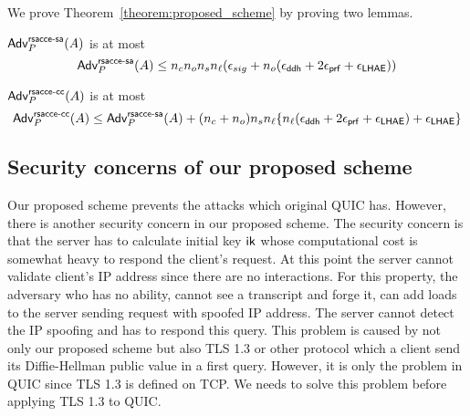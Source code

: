 We prove Theorem~\ref{theorem:proposed_scheme} by proving two lemmas.

\begin{lemma} \label{lemma:proposed_scheme_rsacce-sa}
 $\mathsf{Adv}^{\mathsf{rsacce\textsc{-} sa}}_{P}(A)$ is at most
 \begin{equation}
  \mathsf{Adv}^{\mathsf{rsacce\textsc{-} sa}}_{P}(A) \leq n_c n_o n_s n_{\ell}
  (\epsilon_{sig} + n_o (\epsilon_{\mathsf{ddh}} + 2\epsilon_{\mathsf{prf}} + \epsilon_{\mathsf{LHAE}}))
 \end{equation}
\end{lemma}
%


\begin{lemma} \label{lemma:proposed_scheme_rsacce-cc}
 $\mathsf{Adv}^{\mathsf{rsacce\textsc{-} cc}}_{P}(A)$ is at most
 \begin{equation}
  \mathsf{Adv}^{\mathsf{rsacce\textsc{-} cc}}_{P}(A) \leq \mathsf{Adv}^{\mathsf{rsacce\textsc{-} sa}}_{P}(A) +
  (n_c + n_o) n_s n_{\ell} \{ n_{\ell}(\epsilon_{\mathsf{ddh}} + 2\epsilon_{\mathsf{prf}} + \epsilon_{\mathsf{LHAE}})
  + \epsilon_{\mathsf{LHAE}} \}
 \end{equation}
\end{lemma}
%


\subsection{Security concerns of our proposed scheme} \label{sec:prop_sec_concerns}

Our proposed scheme prevents the attacks which original QUIC has.
However, there is another security concern in our proposed scheme.
The security concern is that the server has to calculate initial
key $\mathsf{ik}$ whose computational cost is somewhat heavy to respond the
client's request.
At this point the server cannot validate client's IP address since
there are no interactions.
For this property, the adversary who has no ability, cannot see a
transcript and forge it, can add loads to the server sending request
with spoofed IP address.
The server cannot detect the IP spoofing and has to respond this query.
This problem is caused by not only our proposed scheme but also TLS 1.3
or other protocol which a client send its Diffie-Hellman public value
in a first query.
However, it is only the problem in QUIC since TLS 1.3 is defined on TCP.
We needs to solve this problem before applying TLS 1.3 to QUIC.


